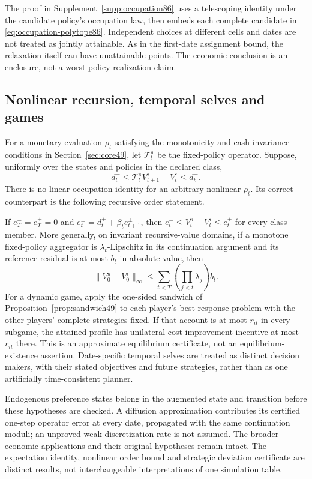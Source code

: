 The proof in Supplement~\ref{supp:occupation86} uses a telescoping identity under the candidate policy's occupation law, then embeds each complete candidate in \eqref{eq:occupation-polytope86}. Independent choices at different cells and dates are not treated as jointly attainable. As in the first-date assignment bound, the relaxation itself can have unattainable points. The economic conclusion is an enclosure, not a worst-policy realization claim.

\subsection{Nonlinear recursion, temporal selves and games}\label{sec:nonlinear86}
For a monetary evaluation $\rho_t$ satisfying the monotonicity and cash-invariance conditions in Section~\ref{sec:core49}, let $\mathcal T_t^\pi$ be the fixed-policy operator. Suppose, uniformly over the states and policies in the declared class,
\[
 d_t^-\le\mathcal T_t^\pi V_{t+1}^\tau-V_t^\tau\le d_t^+.
\]
There is no linear-occupation identity for an arbitrary nonlinear $\rho_t$. Its correct counterpart is the following recursive order statement.

\begin{proposition}\label{prop:nonlinear86}
If $e_T^-=e_T^+=0$ and $e_t^\pm=d_t^\pm+\beta_te_{t+1}^\pm$, then
$e_t^-\le V_t^\pi-V_t^\tau\le e_t^+$ for every class member. More generally, on invariant recursive-value domains, if a monotone fixed-policy aggregator is $\lambda_t$-Lipschitz in its continuation argument and its reference residual is at most $b_t$ in absolute value, then
\[
 \|V_0^\pi-V_0^\tau\|_\infty
 \le\sum_{t<T}\left(\prod_{j<t}\lambda_j\right)b_t.
\]
For a dynamic game, apply the one-sided sandwich of Proposition~\ref{prop:sandwich49} to each player's best-response problem with the other players' complete strategies fixed. If that account is at most $r_{it}$ in every subgame, the attained profile has unilateral cost-improvement incentive at most $r_{it}$ there. This is an approximate equilibrium certificate, not an equilibrium-existence assertion. Date-specific temporal selves are treated as distinct decision makers, with their stated objectives and future strategies, rather than as one artificially time-consistent planner.
\end{proposition}

Endogenous preference states belong in the augmented state and transition before these hypotheses are checked. A diffusion approximation contributes its certified one-step operator error at every date, propagated with the same continuation moduli; an unproved weak-discretization rate is not assumed. The broader economic applications and their original hypotheses remain intact. The expectation identity, nonlinear order bound and strategic deviation certificate are distinct results, not interchangeable interpretations of one simulation table.
